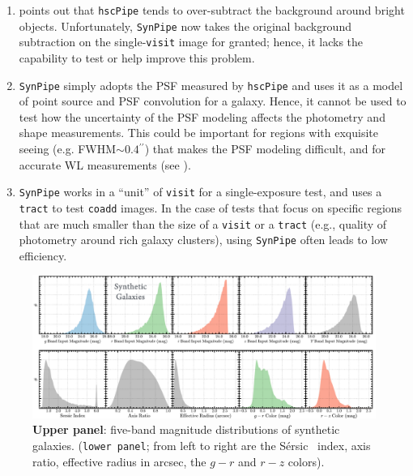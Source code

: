 \documentclass[useamsfonts]{pasj01}
\def\asec{$^{\prime\prime}$}
\def\ser{{S\'{e}rsic\ }}
\def\hscpipe{\texttt{hscPipe}}
\def\synpipe{\texttt{SynPipe}}
\def\coadd{\texttt{coadd}}
\def\tract{\texttt{tract}}
\def\visit{\texttt{visit}}
\begin{document}
    \begin{enumerate}

        \item \citet{HSCDR1} points out that \hscpipe{} tends to over-subtract the
            background around bright objects.
            Unfortunately, \synpipe{} now takes the original background subtraction on
            the single-\visit{} image for granted; hence, it lacks the capability to
            test or help improve this problem.

        \item  \synpipe{} simply adopts the PSF measured by \hscpipe{} and
            uses it as a model of point source and PSF convolution for a galaxy.
            Hence, it cannot be used to test how the uncertainty of the PSF modeling
            affects the photometry and shape measurements.
            This could be important for regions with exquisite seeing 
            (e.g. FWHM${\sim}0.4$\asec{}) that makes the
            PSF modeling difficult, and for accurate WL measurements 
            (see \citealt{HSCDR1}).

        \item \synpipe{} works in a ``unit'' of \visit{} for a single-exposure
            test, and uses a \tract{} to test \coadd{} images.
            In the case of tests that focus on specific regions that are much smaller 
            than the size of a \visit{} or a \tract{} (e.g., quality of photometry
            around rich galaxy clusters), using \synpipe{} often leads to
            low efficiency.

    \end{enumerate}


\begin{figure}
    \begin{center}
        \includegraphics[width=\textwidth]{fig/synpipe_galaxy_sample}
    \end{center}
    \caption{
         \textbf{Upper panel}: five-band magnitude distributions of synthetic
         galaxies. (\texttt{lower panel}; from left to right are the \ser{} index, 
         axis ratio, effective radius in arcsec, the $g-r$ and $r-z$ colors).
         }
    \label{fig:galaxy_sample}
\end{figure}
\end{document}
